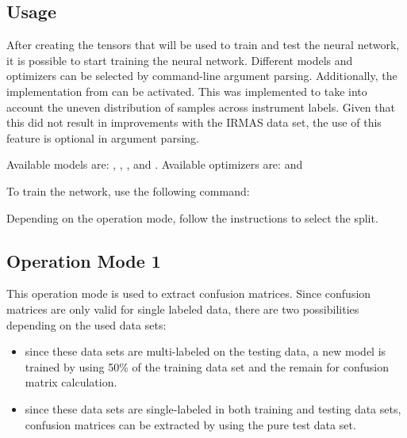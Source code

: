 \documentclass[letterpaper,10pt,english]{sphinxmanual}
\begin{document}
\subsection{Usage}
\label{\detokenize{evaluate:usage}}
After creating the tensors that will be used to train and test the neural network, it is
possible to start training the neural network. Different models and optimizers can be selected
by command-line argument parsing. Additionally, the  implementation from 
can be activated. This was implemented to take into account the uneven distribution of samples
across instrument labels. Given that this did not result in improvements with the IRMAS data
set, the use of this feature is optional in argument parsing.

Available models are: , , , and
. Available optimizers are:  and 

To train the network, use the following command:

%
\begin{sphinxVerbatim}[commandchars=\\\{\}]
       
\end{sphinxVerbatim}

Depending on the operation mode, follow the instructions to select the split.


\subsection{Operation Mode 1}
\label{\detokenize{evaluate:operation-mode-1}}
This operation mode is used to extract confusion matrices. Since confusion matrices are only
valid for single labeled data, there are two possibilities depending on the used data sets:
\begin{itemize}
\item {} 
 since these data sets are multi-labeled on the testing data, a new model is trained by using 50\% of the training data set and the remain for confusion matrix calculation.

\item {} 
 since these data sets are single-labeled in both training and testing data sets, confusion matrices can be extracted by using the pure test data set.

\end{itemize}
\end{document}
